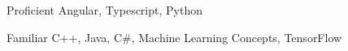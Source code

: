

\begin{cvskills}

  \cvskill
    {Proficient} %
    {Angular, Typescript, Python} %
    
  \cvskill
    {Familiar} %
    {C++, Java, C\#, Machine Learning Concepts, TensorFlow} %

\end{cvskills}


